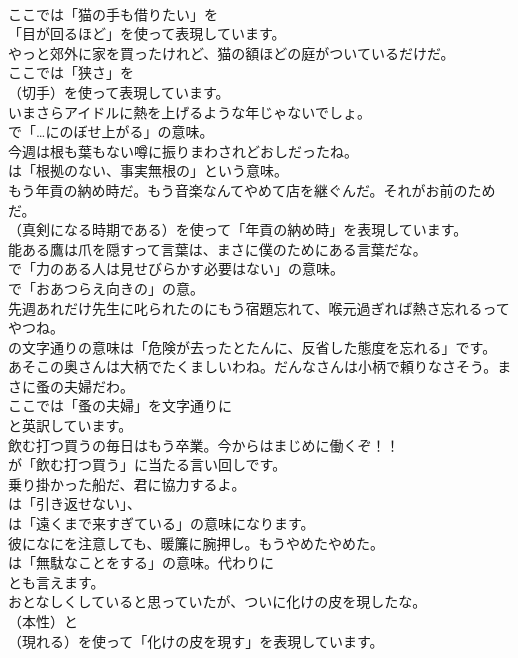 \documentclass[8pt]{extreport}
\begin{document}
\begin{CJK}{UTF8}{min}
\\	ここでは「猫の手も借りたい」を
\\	「目が回るほど」を使って表現しています。	
\\	やっと郊外に家を買ったけれど、猫の額ほどの庭がついているだけだ。 
\\	ここでは「狭さ」を
\\	（切手）を使って表現しています。	
\\	いまさらアイドルに熱を上げるような年じゃないでしょ。 
\\	で「…にのぼせ上がる」の意味。	
\\	今週は根も葉もない噂に振りまわされどおしだったね。 
\\	は「根拠のない、事実無根の」という意味。	
\\	もう年貢の納め時だ。もう音楽なんてやめて店を継ぐんだ。それがお前のためだ。 
\\	（真剣になる時期である）を使って「年貢の納め時」を表現しています。	
\\	能ある鷹は爪を隠すって言葉は、まさに僕のためにある言葉だな。 
\\	で「力のある人は見せびらかす必要はない」の意味。
\\	で「おあつらえ向きの」の意。	
\\	先週あれだけ先生に叱られたのにもう宿題忘れて、喉元過ぎれば熱さ忘れるってやつね。 
\\	の文字通りの意味は「危険が去ったとたんに、反省した態度を忘れる」です。	
\\	あそこの奥さんは大柄でたくましいわね。だんなさんは小柄で頼りなさそう。まさに蚤の夫婦だわ。 
\\	ここでは「蚤の夫婦」を文字通りに
\\	と英訳しています。	
\\	飲む打つ買うの毎日はもう卒業。今からはまじめに働くぞ！！ 
\\	が「飲む打つ買う」に当たる言い回しです。	
\\	乗り掛かった船だ、君に協力するよ。 
\\	は「引き返せない」、
\\	は「遠くまで来すぎている」の意味になります。	
\\	彼になにを注意しても、暖簾に腕押し。もうやめたやめた。 
\\	は「無駄なことをする」の意味。代わりに
\\	とも言えます。	
\\	おとなしくしていると思っていたが、ついに化けの皮を現したな。 
\\	（本性）と
\\	（現れる）を使って「化けの皮を現す」を表現しています。	

\end{CJK}
\end{document}
